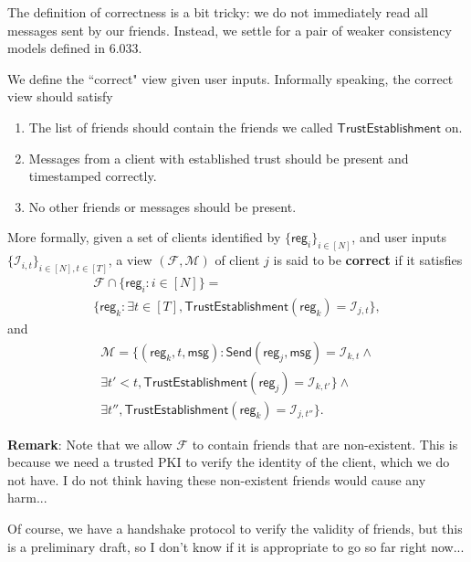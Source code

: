 \documentclass[sigconf, nonacm, balance=false, natbib=false, screen]{acmart}
\newcommand{\msg}{\mathsf{msg}}
\newcommand{\reg}{\mathsf{reg}}
\newcommand{\cI}{\mathcal{I}}
\newcommand{\cF}{\mathcal{F}}
\newcommand{\cM}{\mathcal{M}}
\newcommand{\trust}{\mathsf{TrustEstablishment}}
\newcommand{\send}{\mathsf{Send}}
\begin{document}
The definition of correctness is a bit tricky: we do not immediately read all messages sent by our friends. Instead, we settle for a pair of weaker consistency models defined in 6.033. %
\begin{definition}
We define the ``correct" view given user inputs. Informally speaking, the correct view should satisfy
\begin{enumerate}
    \item The list of friends should contain the friends we called $\trust$ on.         
    \item Messages from a client with established trust should be present and timestamped correctly.  
    \item No other friends or messages should be present. 
\end{enumerate}
More formally, given a set of clients identified by $\{\reg_i\}_{i \in [N]}$, and user inputs $\{\cI_{i, t}\}_{i \in [N], t \in [T]}$, a view $(\cF, \cM)$ of client $j$ is said to be \textbf{correct} if it satisfies
\begin{multline*}
\cF \cap \{\reg_i: i \in [N]\} = 
 \\ \{\reg_k: \exists t \in [T], \trust(\reg_k) = \cI_{j, t}\},    
\end{multline*}
and
\begin{multline*}
 \cM = \{(\reg_k, t, \msg): \send(\reg_j, \msg) = \cI_{k, t} \land \\
 \exists t' < t, \trust(\reg_j) = \cI_{k, t'}\} \land \\
 \exists t'', \trust(\reg_k) = \cI_{j, t''}\} .   
\end{multline*}
\end{definition}
\textbf{Remark}: Note that we allow $\cF$ to contain friends that are non-existent. This is because we need a trusted PKI to verify the identity of the client, which we do not have. I do not think having these non-existent friends would cause any harm...

Of course, we have a handshake protocol to verify the validity of friends, but this is a preliminary draft, so I don't know if it is appropriate to go so far right now...
\end{document}
